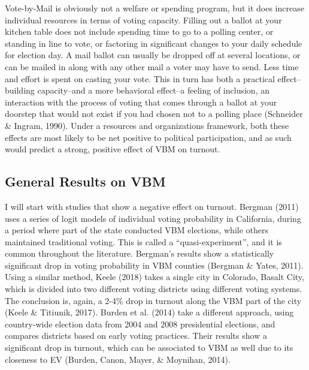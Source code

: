 \documentclass[12pt,twoside]{reedthesis}
\begin{document}
  Vote-by-Mail is obviously not a welfare or spending program, but it does
  increase individual resources in terms of voting capacity. Filling out a
  ballot at your kitchen table does not include spending time to go to a
  polling center, or standing in line to vote, or factoring in significant
  changes to your daily schedule for election day. A mail ballot can
  usually be dropped off at several locations, or can be mailed in along
  with any other mail a voter may have to send. Less time and effort is
  spent on casting your vote. This in turn has both a practical
  effect--building capacity--and a more behavioral effect--a feeling of
  inclusion, an interaction with the process of voting that comes through
  a ballot at your doorstep that would not exist if you had chosen not to
  a polling place (Schneider \& Ingram, 1990). Under a resources and
  organizations framework, both these effects are most likely to be net
  positive to political participation, and as such would predict a strong,
  positive effect of VBM on turnout.
  
  \subsection{General Results on VBM}\label{general-results-on-vbm}
  
  I will start with studies that show a negative effect on turnout.
  Bergman (2011) uses a series of logit models of individual voting
  probability in California, during a period where part of the state
  conducted VBM elections, while others maintained traditional voting.
  This is called a ``quasi-experiment'', and it is common throughout the
  literature. Bergman's results show a statistically significant drop in
  voting probability in VBM counties (Bergman \& Yates, 2011). Using a
  similar method, Keele (2018) takes a single city in Colorado, Basalt
  City, which is divided into two different voting districts using
  different voting systems. The conclusion is, again, a 2-4\% drop in
  turnout along the VBM part of the city (Keele \& Titiunik, 2017). Burden
  et al. (2014) take a different approach, using country-wide election
  data from 2004 and 2008 presidential elections, and compares districts
  based on early voting practices. Their results show a significant drop
  in turnout, which can be associated to VBM as well due to its closeness
  to EV (Burden, Canon, Mayer, \& Moynihan, 2014).
  
\end{document}
